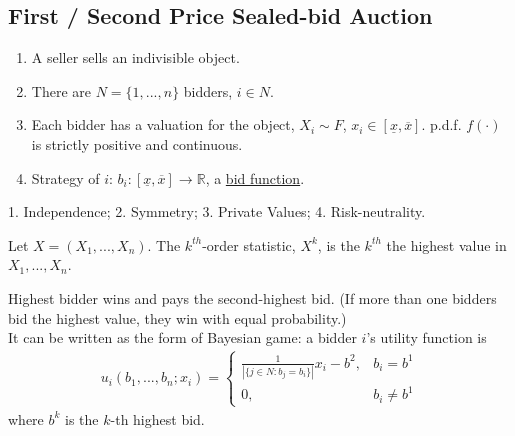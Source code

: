 \documentclass[11pt]{elegantbook}
\begin{document}
\subsection{First / Second Price Sealed-bid Auction}
\begin{enumerate}[$\circ$]
    \item A seller sells an indivisible object.
    \item There are $N=\{1,...,n\}$ bidders, $i\in N$.
    \item Each bidder has a valuation for the object, $X_i\sim F$, $x_i\in[\underline{x},\overline{x}]$. p.d.f. $f(\cdot)$ is strictly positive and continuous.
    \item Strategy of $i$: $b_i:[\underline{x},\overline{x}] \rightarrow \mathbb{R}$, a \underline{bid function}.
\end{enumerate}

\begin{assumption}
    1. Independence; 2. Symmetry; 3. Private Values; 4. Risk-neutrality.
\end{assumption}

Let $X=(X_1,...,X_n)$. The $k^{th}$-order statistic, $X^k$, is the $k^{th}$ the highest value in $X_1,...,X_n$.

\begin{definition}
    \normalfont
    Highest bidder wins and pays the second-highest bid. (If more than one bidders bid the highest value, they win with equal probability.)\\
    It can be written as the form of Bayesian game: a bidder $i$'s utility function is
    \begin{equation}
        \begin{aligned}
            u_i(b_1,...,b_n;x_i)=\left\{\begin{matrix}
                \frac{1}{|\{j\in N:b_j=b_i\}|}x_i-b^2,&b_i=b^1\\
                0,&b_i\neq b^1
            \end{matrix}\right.
        \end{aligned}
        \nonumber
    \end{equation}
    where $b^k$ is the $k$-th highest bid.
\end{definition}
\end{document}
